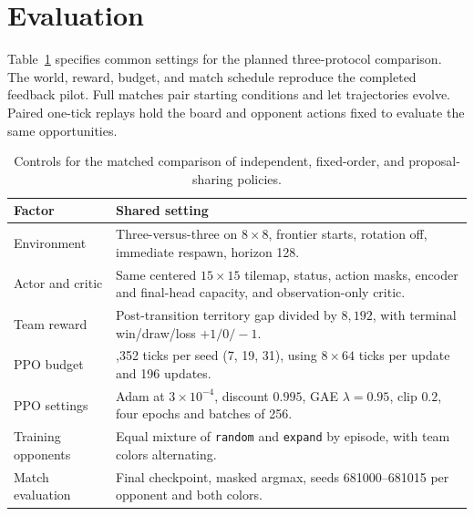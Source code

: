 \documentclass{article}
\begin{document}
\section{Evaluation}
\label{sec:evaluation}

Table~\ref{tab:controls} specifies common settings for the planned three-protocol comparison. The world, reward, budget, and match schedule reproduce the completed feedback pilot. Full matches pair starting conditions and let trajectories evolve. Paired one-tick replays hold the board and opponent actions fixed to evaluate the same opportunities.

\begin{table}[H]
  \centering
  \caption{Controls for the matched comparison of independent, fixed-order, and proposal-sharing policies.}
  \label{tab:controls}
  \begin{tabularx}{\linewidth}{@{}>{\raggedright\arraybackslash}p{.25\linewidth}>{\raggedright\arraybackslash}X@{}}
    \toprule
    Factor & Shared setting \\
    \midrule
    Environment & Three-versus-three on \(8\times8\), frontier starts, rotation off, immediate respawn, horizon 128. \\
    Actor and critic & Same centered \(15\times15\) tilemap, status, action masks, encoder and final-head capacity, and observation-only critic. \\
    Team reward & Post-transition territory gap divided by \(8{,}192\), with terminal win/draw/loss \(+1/0/-1\). \\
    PPO budget & 100,352 ticks per seed (7, 19, 31), using \(8\times64\) ticks per update and 196 updates. \\
    PPO settings & Adam at \(3\times10^{-4}\), discount \(0.995\), GAE \(\lambda=0.95\), clip \(0.2\), four epochs and batches of 256. \\
    Training opponents & Equal mixture of \texttt{random} and \texttt{expand} by episode, with team colors alternating. \\
    Match evaluation & Final checkpoint, masked argmax, seeds 681000--681015 per opponent and both colors. \\
    \bottomrule
  \end{tabularx}
\end{table}
\end{document}
